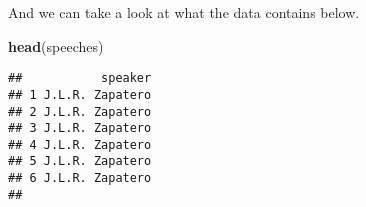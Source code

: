 \documentclass[
]{article}
\newenvironment{Shaded}{\begin{snugshade}}{\end{snugshade}}
\newcommand{\FunctionTok}[1]{\textcolor[rgb]{0.13,0.29,0.53}{\textbf{#1}}}
\newcommand{\NormalTok}[1]{#1}
\begin{document}
And we can take a look at what the data contains below.

\begin{Shaded}
\begin{Highlighting}[]
\FunctionTok{head}\NormalTok{(speeches)}
\end{Highlighting}
\end{Shaded}

\begin{verbatim}
##           speaker
## 1 J.L.R. Zapatero
## 2 J.L.R. Zapatero
## 3 J.L.R. Zapatero
## 4 J.L.R. Zapatero
## 5 J.L.R. Zapatero
## 6 J.L.R. Zapatero
##                                                                                                                                                                                                                                                                                                                                                                                                                                                                                                                                                                                                                                                                                                                                                                                                                                                                                                                                                                                                                                                                                                                                                                                                                                                                                                                                                                                                                                                                                                                                                                                                                                                                                                                                                                                                                                                                                                                                                                                                                                                                                                                                                                                                                                                                                                                                                                                                                                                                                                                                                                                                                                                                                                                                                                       
\end{verbatim}
\end{document}

